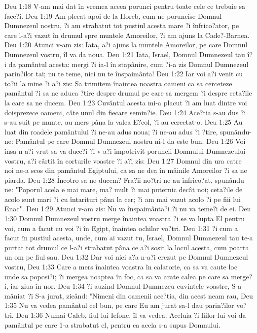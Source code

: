 Deu 1:18  V-am mai dat în vremea aceea porunci pentru toate cele ce trebuie sa face?i.
Deu 1:19  Am plecat apoi de la Horeb, cum ne poruncise Domnul Dumnezeul nostru, ?i am strabatut tot pustiul acesta mare ?i înfrico?ator, pe care l-a?i vazut în drumul spre muntele Amoreilor, ?i am ajuns la Cade?-Barnea.
Deu 1:20  Atunci v-am zis: Iata, a?i ajuns la muntele Amoreilor, pe care Domnul Dumnezeul vostru, îl va da noua.
Deu 1:21  Iata, Israel, Domnul Dumnezeul tau î?i da pamântul acesta: mergi ?i ia-l în stapânire, cum ?i-a zis Domnul Dumnezeul parin?ilor tai; nu te teme, nici nu te înspaimânta!
Deu 1:22  Iar voi a?i venit cu to?ii la mine ?i a?i zis: Sa trimitem înaintea noastra oameni ca sa cerceteze pamântul ?i sa ne aduca ?tire despre drumul pe care sa mergem ?i despre ceta?ile la care sa ne ducem.
Deu 1:23  Cuvântul acesta mi-a placut ?i am luat dintre voi doisprezece oameni, câte unul din fiecare semin?ie.
Deu 1:24  Ace?tia s-au dus ?i s-au suit pe munte, au mers pâna la valea E?col, ?i au cercetat-o.
Deu 1:25  Au luat din roadele pamântului ?i ne-au adus noua; ?i ne-au adus ?i ?tire, spunându-ne: Pamântul pe care Domnul Dumnezeul nostru ni-l da este bun.
Deu 1:26  Voi însa n-a?i vrut sa va duce?i ?i v-a?i împotrivit poruncii Domnului Dumnezeului vostru, a?i cârtit în corturile voastre ?i a?i zis:
Deu 1:27  Domnul din ura catre noi ne-a scos din pamântul Egiptului, ca sa ne dea în mâinile Amoreilor ?i sa ne piarda.
Deu 1:28  Încotro sa ne ducem? Fra?ii no?tri ne-au înfrico?at, spunându-ne: "Poporul acela e mai mare, ma? mult ?i mai puternic decât noi; ceta?ile de acolo sunt mari ?i cu întarituri pâna la cer; ?i am mai vazut acolo ?i pe fiii lui Enac".
Deu 1:29  Atunci v-am zis: Nu va înspaimânta?i ?i nu va teme?i de ei.
Deu 1:30  Domnul Dumnezeul vostru merge înaintea voastra ?i se va lupta El pentru voi, cum a facut cu voi ?i în Egipt, înaintea ochilor vo?tri.
Deu 1:31  ?i cum a facut în pustiul acesta, unde, cum ai vazut tu, Israel, Domnul Dumnezeul tau te-a purtat tot drumul ce l-a?i strabatut pâna ce a?i sosit la locul acesta, cum poarta un om pe fiul sau.
Deu 1:32  Dar voi nici a?a n-a?i crezut pe Domnul Dumnezeul vostru,
Deu 1:33  Care a mers înaintea voastra în calatorie, ca sa va caute loc unde sa poposi?i; ?i mergea noaptea în foc, ca sa va arate calea pe care sa merge?i, iar ziua în nor.
Deu 1:34  ?i auzind Domnul Dumnezeu cuvintele voastre, S-a mâniat ?i S-a jurat, zicând: "Nimeni din oamenii ace?tia, din acest neam rau,
Deu 1:35  Nu va vedea pamântul cel bun, pe care Eu am jurat sa-l dau parin?ilor vo?tri.
Deu 1:36  Numai Caleb, fiul lui Iefone, îl va vedea. Aceluia ?i fiilor lui voi da pamântul pe care 1-a strabatut el, pentru ca acela s-a supus Domnului.

